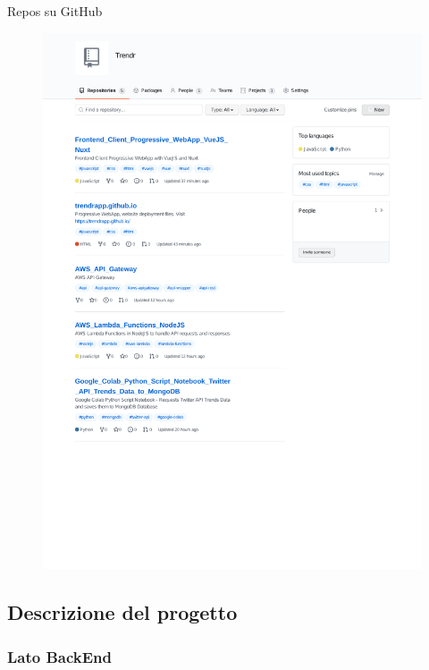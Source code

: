 \documentclass[xcolor=svgnames, aspectratio=169]{beamer}
\begin{document}

\begin{frame}{Repos su GitHub}
    \vspace*{-24pt}
    \begin{figure}[H]
        \centering
        \includegraphics[width=0.75\paperwidth,height=0.87\paperheight,keepaspectratio]{Github_Repos.pdf}
    \end{figure}
\end{frame}


\subsection{Descrizione del progetto}

\subsubsection{Lato BackEnd}
\end{document}
